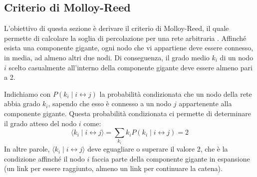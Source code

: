 \documentclass[12pt,italian]{article}
\begin{document}
\subsection{Criterio di Molloy-Reed}\label{sec:molloy_reed}
L'obiettivo di questa sezione è derivare il criterio di Molloy-Reed, il quale permette di calcolare la soglia di percolazione per una rete arbitraria \cite{barabasi2016network}. Affinché esista una componente gigante, ogni nodo che vi appartiene deve essere connesso, in media, ad almeno altri due nodi. Di conseguenza, il grado medio $k_i$ di un nodo $i$ scelto casualmente all'interno della componente gigante deve essere almeno pari a 2.

Indichiamo con $P(k_i \mid i \leftrightarrow j)$ la probabilità condizionata che un nodo della rete abbia grado $k_i$, sapendo che esso è connesso a un nodo $j$ appartenente alla componente gigante. Questa probabilità condizionata ci permette di determinare il grado atteso del nodo $i$ come:
\begin{equation}
    \langle k_i \mid i \leftrightarrow j \rangle = \sum_{k_i} k_i P(k_i \mid i \leftrightarrow j) = 2
    \label{eq:cond_degree}
\end{equation}
In altre parole, $\langle k_i \mid i \leftrightarrow j \rangle$ deve eguagliare o superare il valore 2, che è la condizione affinché il nodo $i$ faccia parte della componente gigante in espansione (un link per essere raggiunto, almeno un link per continuare la catena). 
\end{document}
